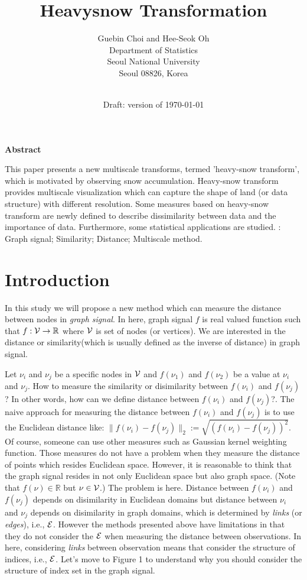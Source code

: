 \documentclass[preprint, review, 12pt]{article}
\title{\bf Heavysnow Transformation}
\author{
\sc  Guebin Choi and Hee-Seok Oh\\ 
Department of Statistics\\
Seoul National University\\
Seoul 08826, Korea \\
\\
}
\date{Draft: version of \today}
\theoremstyle{definition}
\theoremstyle{remark}
\begin{document}
\maketitle

\newpage
\thispagestyle{empty}

\begin{center}
{\bf Abstract}
\end{center}
\noindent 
This paper presents a new multiscale transforms, termed 'heavy-snow transform', which is motivated by observing snow accumulation. Heavy-snow transform provides multiscale visualization which can capture the shape of land (or data structure) with different resolution. Some measures based on heavy-snow transform are newly defined to describe dissimilarity between data and the importance of data. Furthermore, some statistical applications are studied. 
\vskip 5mm
: Graph signal; Similarity; Distance; Multiscale method. 
\newpage


\section{Introduction}
In this study we will propose a new method which can measure the distance between nodes in \emph{graph signal}. In here, graph signal $f$ is real valued function such that $f:{\cal V} \to \mathbb{R}$ where ${\cal V}$ is set of nodes (or vertices). We are interested in the distance or similarity(which is usually defined as the inverse of distance) in graph signal. 

Let $\nu_i$ and $\nu_j$ be a specific nodes in ${\cal V}$ and $f(\nu_1)$ and $f(\nu_2)$ be a value at $\nu_i$ and $\nu_j$. How to measure the similarity or disimilarity between $f(\nu_i)$ and $f(\nu_j)$? In other words, how can we define distance between $f(\nu_i)$ and $f(\nu_j)$?. The naive approach for measuring the distance between $f(\nu_i)$ and $f(\nu_j)$ is to use the Euclidean distance like: 
$
\|f(\nu_i)-f(\nu_j)\|_2:=\sqrt{(f(\nu_i)-f(\nu_j))^2}.
$ Of course, someone can use other measures such as Gaussian kernel weighting function. Those measures do not have a problem when they measure the distance of points which resides Euclidean space. However, it is reasonable to think that the graph signal resides in not only Euclidean space but also graph space. (Note that $f(\nu)\in \mathbb{R}$ but $\nu \in {\cal V}$.) The problem is here. Distance between $f(\nu_i)$ and $f(\nu_j)$ depends on disimilarity in Euclidean domains but distance between $\nu_i$ and $\nu_j$ depends on disimilarity in graph domains, which is determined by \emph{links} (or \emph{edges}), i.e., ${\cal E}$. However the methods presented above have limitations in that they do not consider the ${\cal E}$ when measuring the distance between observations. In here, considering \emph{links} between observation means that consider the structure of indices, i.e., ${\cal E}$. Let's move to Figure 1 to understand why you should consider the structure of index set in the graph signal. 
\end{document}
